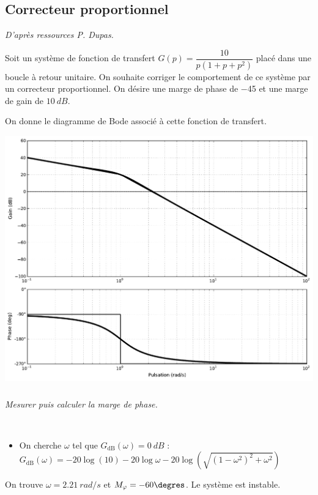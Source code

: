 \documentclass[10pt,fleqn]{article} %
\begin{document}
\fi
\begin{multicols}{2}


\newpage
\subsection*{Correcteur proportionnel}
\textit{D'après ressources P. Dupas.}


\setcounter{exo}{0}
Soit un système de fonction de transfert $G(p)=\dfrac{10}{p\left(1+p+p^2\right)}$ placé dans une boucle à retour unitaire. On souhaite corriger le comportement de ce système par un correcteur proportionnel. On désire une marge de phase de \SI{-45}{\degres} et une marge de gain de $\SI{10}{dB}$.

On donne le diagramme de Bode associé à cette fonction de transfert. 
\begin{center}
\includegraphics[width=\linewidth]{images/exo_01_bode}
\end{center}


\subparagraph{}\textit{Mesurer puis calculer la marge de phase.}
\ifprof
\begin{corrige}~\\
\begin{itemize}
\item On cherche $\omega$ tel que $G_{\text{dB}}(\omega)=\SI{0}{dB}$  :
$G_{\text{dB}}(\omega)=-20\log(10) -20\log\omega-20\log\left(\sqrt{(1-\omega^2)^2+\omega^2}\right)$
\end{itemize}

On trouve $\omega=\SI{2,21}{rad/s}$ et $M_{\varphi}=-60\degres$. Le système est instable.
\end{corrige}
\else
\fi


\end{multicols}
\end{document}
